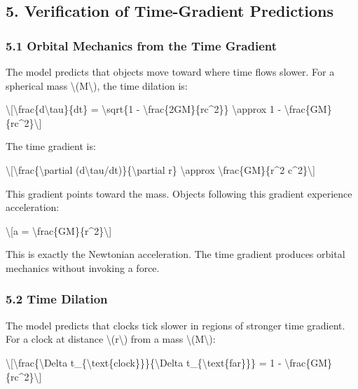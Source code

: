 \documentclass[
  10pt,
]{article}
\begin{document}
\hypertarget{verification-of-time-gradient-predictions}{%
\subsection{5. Verification of Time-Gradient
Predictions}\label{verification-of-time-gradient-predictions}}

\hypertarget{orbital-mechanics-from-the-time-gradient}{%
\subsubsection{5.1 Orbital Mechanics from the Time
Gradient}\label{orbital-mechanics-from-the-time-gradient}}

The model predicts that objects move toward where time flows slower. For
a spherical mass \textbackslash(M\textbackslash), the time dilation is:

\textbackslash{[}\textbackslash frac\{d\textbackslash tau\}\{dt\} =
\textbackslash sqrt\{1 - \textbackslash frac\{2GM\}\{rc\^{}2\}\}
\textbackslash approx 1 -
\textbackslash frac\{GM\}\{rc\^{}2\}\textbackslash{]}

The time gradient is:

\textbackslash{[}\textbackslash frac\{\textbackslash partial
(d\textbackslash tau/dt)\}\{\textbackslash partial r\}
\textbackslash approx \textbackslash frac\{GM\}\{r\^{}2
c\^{}2\}\textbackslash{]}

This gradient points toward the mass. Objects following this gradient
experience acceleration:

\textbackslash{[}a =
\textbackslash frac\{GM\}\{r\^{}2\}\textbackslash{]}

This is exactly the Newtonian acceleration. The time gradient produces
orbital mechanics without invoking a force.

\hypertarget{time-dilation}{%
\subsubsection{5.2 Time Dilation}\label{time-dilation}}

The model predicts that clocks tick slower in regions of stronger time
gradient. For a clock at distance \textbackslash(r\textbackslash) from a
mass \textbackslash(M\textbackslash):

\textbackslash{[}\textbackslash frac\{\textbackslash Delta
t\_\{\textbackslash text\{clock\}\}\}\{\textbackslash Delta
t\_\{\textbackslash text\{far\}\}\} = 1 -
\textbackslash frac\{GM\}\{rc\^{}2\}\textbackslash{]}
\end{document}
